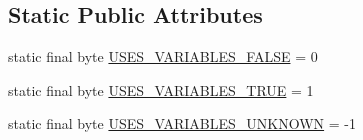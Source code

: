 \subsection*{Static Public Attributes}
\begin{DoxyCompactItemize}
\item 
static final byte \mbox{\hyperlink{classcom_1_1mysql_1_1cj_1_1jdbc_1_1_statement_impl_abbc3c2e085f83d079cf486f4c460d127}{U\+S\+E\+S\+\_\+\+V\+A\+R\+I\+A\+B\+L\+E\+S\+\_\+\+F\+A\+L\+SE}} = 0
\item 
static final byte \mbox{\hyperlink{classcom_1_1mysql_1_1cj_1_1jdbc_1_1_statement_impl_ae55f926f3d136716603ff6d792d73230}{U\+S\+E\+S\+\_\+\+V\+A\+R\+I\+A\+B\+L\+E\+S\+\_\+\+T\+R\+UE}} = 1
\item 
static final byte \mbox{\hyperlink{classcom_1_1mysql_1_1cj_1_1jdbc_1_1_statement_impl_a37cd97de6fa460a4f219706ef6375e74}{U\+S\+E\+S\+\_\+\+V\+A\+R\+I\+A\+B\+L\+E\+S\+\_\+\+U\+N\+K\+N\+O\+WN}} = -\/1
\end{DoxyCompactItemize}
